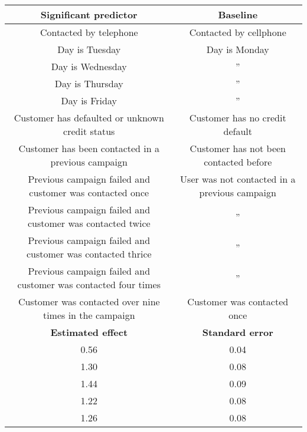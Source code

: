 \documentclass[9pt]{article}
\begin{document}
\begin{longtable}{|c|c|}
            \hline
            \textbf{Significant predictor} & \textbf{Baseline} \\

            \hline
            Contacted by telephone & Contacted by cellphone \\
            
            \hline
            Day is Tuesday & Day is Monday \\
            Day is Wednesday & '' \\
            Day is Thursday & '' \\
            Day is Friday & '' \\

            \hline
            Customer has defaulted or unknown credit status & Customer has no credit default \\

            \hline
            Customer has been contacted in a previous campaign & Customer has not been contacted before \\

            \hline
            Previous campaign failed and customer was contacted once & User was not contacted in a previous campaign \\
            Previous campaign failed and customer was contacted twice & '' \\
            Previous campaign failed and customer was contacted thrice & '' \\
            Previous campaign failed and customer was contacted four times & '' \\

            \hline
            Customer was contacted over nine times in the campaign & Customer was contacted once \\
            
            \hline
            \textbf{Estimated effect} & \textbf{Standard error} \\ 
            \hline
            
            \hline
            0.56 & 0.04 \\

            \hline
            1.30 & 0.08 \\
            1.44 & 0.09 \\
            1.22 & 0.08 \\
            1.26 & 0.08 \\


\end{longtable}
\end{document}
